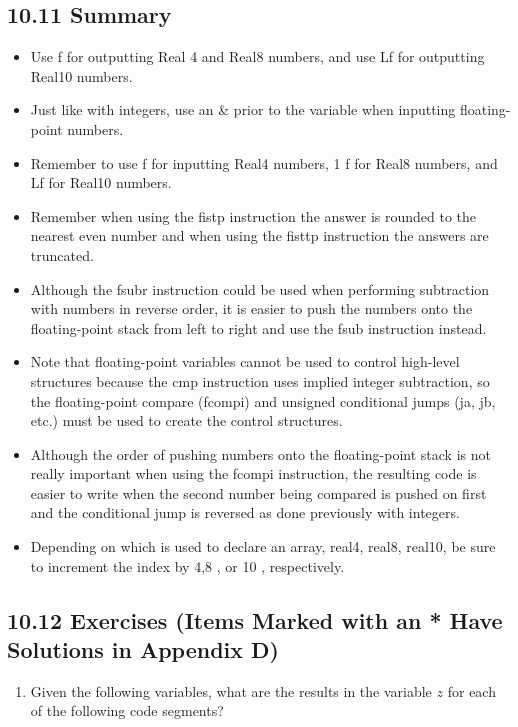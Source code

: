 \documentclass[10pt]{article}
\begin{document}
\subsection*{10.11 Summary}
\begin{itemize}
  \item Use f for outputting Real 4 and Real8 numbers, and use Lf for outputting Real10 numbers.
  \item Just like with integers, use an \& prior to the variable when inputting floating-point numbers.
  \item Remember to use f for inputting Real4 numbers, 1 f for Real8 numbers, and Lf for Real10 numbers.
  \item Remember when using the fistp instruction the answer is rounded to the nearest even number and when using the fisttp instruction the answers are truncated.
  \item Although the fsubr instruction could be used when performing subtraction with numbers in reverse order, it is easier to push the numbers onto the floating-point stack from left to right and use the fsub instruction instead.
  \item Note that floating-point variables cannot be used to control high-level structures because the cmp instruction uses implied integer subtraction, so the floating-point compare (fcompi) and unsigned conditional jumps (ja, jb, etc.) must be used to create the control structures.
  \item Although the order of pushing numbers onto the floating-point stack is not really important when using the fcompi instruction, the resulting code is easier to write when the second number being compared is pushed on first and the conditional jump is reversed as done previously with integers.
  \item Depending on which is used to declare an array, real4, real8, real10, be sure to increment the index by 4,8 , or 10 , respectively.
\end{itemize}

\subsection*{10.12 Exercises (Items Marked with an * Have Solutions in Appendix D)}
\begin{enumerate}
  \item Given the following variables, what are the results in the variable $z$ for each of the following code segments?
\end{enumerate}
\end{document}

